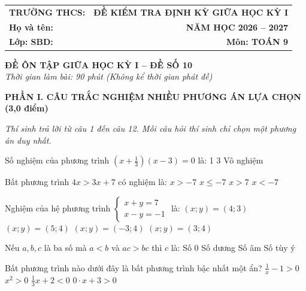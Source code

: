 \documentclass[12pt,a4paper]{article}
\begin{document}
\noindent
\begin{tabularx}{\linewidth}{X r}
\textbf{TRƯỜNG THCS: \dotfill} & \textbf{ĐỀ KIỂM TRA ĐỊNH KỲ GIỮA HỌC KỲ I} \\
\textbf{Họ và tên: \dotfill} & \textbf{NĂM HỌC 2026 -- 2027} \\
\textbf{Lớp: \dotfill \quad SBD: \dotfill} & \textbf{Môn: TOÁN 9} \\
\hline
\end{tabularx}
\vspace{2mm}

\begin{center}
  \textbf{\large ĐỀ ÔN TẬP GIỮA HỌC KỲ I -- ĐỀ SỐ 10}\\
  \textit{Thời gian làm bài: 90 phút (Không kể thời gian phát đề)}
\end{center}
\vspace{1mm}

\noindent\textbf{\large PHẦN I. CÂU TRẮC NGHIỆM NHIỀU PHƯƠNG ÁN LỰA CHỌN (3,0 điểm)}

\textit{Thí sinh trả lời từ câu 1 đến câu 12. Mỗi câu hỏi thí sinh chỉ chọn một phương án duy nhất.}

\vspace{1mm}
\begin{ex}
Số nghiệm của phương trình $\left(x + \frac{1}{3}\right)(x - 3) = 0$ là:
\choice
{1}
{3}
{}
{Vô nghiệm}
\end{ex}

\begin{ex}
Bất phương trình $4x > 3x + 7$ có nghiệm là:
\choice
{$x > -7$}
{$x \le -7$}
{\True $x > 7$}
{$x < -7$}
\end{ex}

\begin{ex}
Nghiệm của hệ phương trình $\begin{cases} x + y = 7 \\ x - y = -1 \end{cases}$ là:
\choice
{$(x; y) = (4; 3)$}
{$(x; y) = (5; 4)$}
{$(x; y) = (-3; 4)$}
{\True $(x; y) = (3; 4)$}
\end{ex}

\begin{ex}
Nếu $a, b, c$ là ba số mà $a < b$ và $ac > bc$ thì $c$ là:
\choice
{Số 0}
{Số dương}
{\True Số âm}
{Số tùy ý}
\end{ex}

\begin{ex}
Bất phương trình nào dưới đây là bất phương trình bậc nhất một ẩn?
\choice
{$\frac{1}{x} - 1 > 0$}
{$x^2 > 0$}
{\True $\frac{1}{3}x + 2 < 0$}
{$0 \cdot x + 3 > 0$}
\end{ex}
\end{document}
